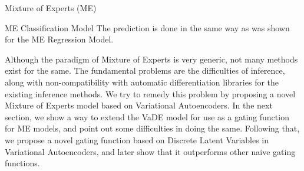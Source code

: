 \documentclass{article}
\begin{document}
\begin{psection}{Mixture of Experts (ME)}
\begin{psubsection}{ME Classification Model}
		The prediction is done in the same way as was shown for the ME Regression Model.

	\end{psubsection}

	Although the paradigm of Mixture of Experts is very generic, not many methods exist for the same. The fundamental problems are the difficulties of inference, along with non-compatibility with automatic differentiation libraries for the existing inference methods. We try to remedy this problem by proposing a novel Mixture of Experts model based on Variational Autoencoders. In the next section, we show a way to extend the VaDE model for use as a gating function for ME models, and point out some difficulties in doing the same. Following that, we propose a novel gating function based on Discrete Latent Variables in Variational Autoencoders, and later show that it outperforms other naive gating functions.
\end{psection}
\end{document}

